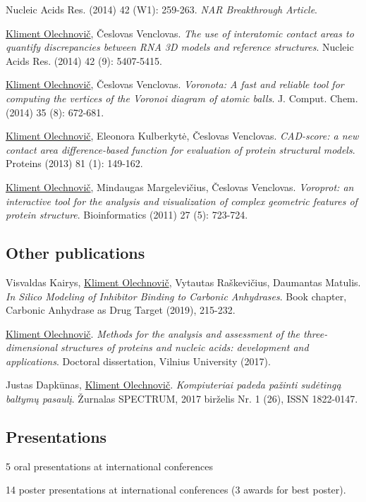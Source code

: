 \documentclass{article}
\newenvironment{enumerate_tight}{
\begin{enumerate}
  \setlength{\itemsep}{4pt}
  \setlength{\parskip}{0pt}
  \setlength{\parsep}{0pt}
}{\end{enumerate}}
\newenvironment{itemize_tight}{
\begin{itemize}
  \setlength{\itemsep}{4pt}
  \setlength{\parskip}{0pt}
  \setlength{\parsep}{0pt}
}{\end{itemize}}
\begin{document}
\begin{enumerate_tight}
        Nucleic Acids Res. (2014) 42 (W1): 259-263. \emph{NAR Breakthrough Article}.
  \item \underline{Kliment Olechnovič}, Česlovas Venclovas.
        \emph{The use of interatomic contact areas to quantify discrepancies between RNA 3D models and reference structures}.
        Nucleic Acids Res. (2014) 42 (9): 5407-5415.
  \item \underline{Kliment Olechnovič}, Česlovas Venclovas.
        \emph{Voronota: A fast and reliable tool for computing the vertices of the Voronoi diagram of atomic balls}.
        J. Comput. Chem. (2014) 35 (8): 672-681.
  \item \underline{Kliment Olechnovič}, Eleonora Kulberkytė, Česlovas Venclovas.
        \emph{CAD-score: a new contact area difference-based function for evaluation of protein structural models}.
        Proteins (2013) 81 (1): 149-162.
  \item \underline{Kliment Olechnovič}, Mindaugas Margelevičius, Česlovas Venclovas.
        \emph{Voroprot: an interactive tool for the analysis and visualization of complex geometric features of protein structure}.
        Bioinformatics (2011) 27 (5): 723-724.
\end{enumerate_tight}

\subsection*{Other publications}
\begin{itemize_tight}
  \item Visvaldas Kairys, \underline{Kliment Olechnovič}, Vytautas Raškevičius, Daumantas Matulis.
        \emph{In Silico Modeling of Inhibitor Binding to Carbonic Anhydrases}.
        Book chapter, Carbonic Anhydrase as Drug Target (2019), 215-232.
  \item \underline{Kliment Olechnovič}.
        \emph{Methods for the analysis and assessment of the three-dimensional structures of proteins and nucleic acids: development and applications}.
        Doctoral dissertation, Vilnius University (2017).
  \item Justas Dapkūnas, \underline{Kliment Olechnovič}.
        \emph{Kompiuteriai padeda pažinti sudėtingą baltymų pasaulį}.
        Žurnalas SPECTRUM, 2017 birželis Nr. 1 (26), ISSN 1822-0147.
\end{itemize_tight}

\subsection*{Presentations}
\begin{itemize_tight}
  \item 5 oral presentations at international conferences
  \item 14 poster presentations at international conferences (3 awards for best poster).
\end{itemize_tight}
\end{document}
